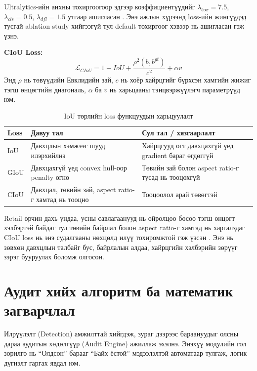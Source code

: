 Ultralytics-ийн анхны тохиргоогоор эдгээр коэффициентүүдийг \(\lambda_{box}=7.5\), \(\lambda_{cls}=0.5\), \(\lambda_{dfl}=1.5\) утгаар ашигласан \cite{yolov8_ultralytics}. Энэ ажлын хүрээнд loss-ийн жингүүдэд тусгай ablation study хийгээгүй тул default тохиргоог хэвээр нь ашигласан гэж үзнэ.

\textbf{CIoU Loss:}
\begin{equation}
    \mathcal{L}_{CIoU} = 1 - IoU + \frac{\rho^2(b, b^{gt})}{c^2} + \alpha v
\end{equation}
Энд $\rho$ нь төвүүдийн Евклидийн зай, $c$ нь хоёр хайрцгийг бүрхсэн хамгийн жижиг тэгш өнцөгтийн диагональ, $\alpha$ ба $v$ нь харьцааны тэнцвэржүүлэгч параметрүүд юм.

\begin{longtable}{|p{2.6cm}|p{4cm}|p{5.6cm}|}
\caption{IoU төрлийн loss функцуудын харьцуулалт}
\label{tab:iou_loss_comparison} \\
\hline
\textbf{Loss} & \textbf{Давуу тал} & \textbf{Сул тал / хязгаарлалт} \\
\hline
IoU & Давхцлын хэмжээг шууд илэрхийлнэ & Хайрцгууд огт давхцахгүй үед gradient бараг өгдөггүй \\
\hline
GIoU & Давхцахгүй үед convex hull-оор penalty өгнө & Төвийн зай болон aspect ratio-г тусад нь тооцохгүй \\
\hline
CIoU & Давхцал, төвийн зай, aspect ratio-г хамтад нь тооцно & Тооцоолол арай төвөгтэй \\
\hline
\end{longtable}

Retail орчин дахь ундаа, усны савлагаанууд нь ойролцоо босоо тэгш өнцөгт хэлбэртэй байдаг тул төвийн байрлал болон aspect ratio-г хамтад нь харгалздаг CIoU loss нь энэ судалгааны нөхцөлд илүү тохиромжтой гэж үзсэн \cite{ciou_loss}. Энэ нь зөвхөн давхцлын талбайг бус, байрлалын алдаа, хайрцгийн хэлбэрийн зөрүүг зэрэг бууруулах боломж олгосон.

\section{Аудит хийх алгоритм ба математик загварчлал}

Илрүүлэлт (Detection) амжилттай хийгдэж, зураг дээрээс бараануудыг олсны дараа аудитын хөдөлгүүр (Audit Engine) ажиллаж эхэлнэ. Энэхүү модулийн гол зорилго нь ``Олдсон'' барааг ``Байх ёстой'' мэдээлэлтэй автоматаар тулгаж, логик дүгнэлт гаргах явдал юм.

